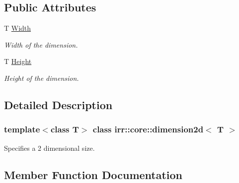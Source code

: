 \subsection*{Public Attributes}
\begin{DoxyCompactItemize}
\item 
\mbox{\label{classirr_1_1core_1_1dimension2d_a0399dcc023c19d381d1a192596107db4}} 
T \hyperlink{classirr_1_1core_1_1dimension2d_a0399dcc023c19d381d1a192596107db4}{Width}
\begin{DoxyCompactList}\small\item\em Width of the dimension. \end{DoxyCompactList}\item 
\mbox{\label{classirr_1_1core_1_1dimension2d_a89b253523d31336c6b2a6a56dfd48a6b}} 
T \hyperlink{classirr_1_1core_1_1dimension2d_a89b253523d31336c6b2a6a56dfd48a6b}{Height}
\begin{DoxyCompactList}\small\item\em Height of the dimension. \end{DoxyCompactList}\end{DoxyCompactItemize}


\subsection{Detailed Description}
\subsubsection*{template$<$class T$>$\newline
class irr\+::core\+::dimension2d$<$ T $>$}

Specifies a 2 dimensional size. 

\subsection{Member Function Documentation}
\mbox{\label{classirr_1_1core_1_1dimension2d_a30981123f90a2221acd85c1fe4364eee}} 
